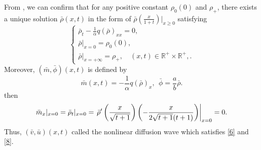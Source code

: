 \documentclass[11pt]{article}
\theoremstyle{plain}
\numberwithin{equation}{section}
\begin{document}
From \cite{Duyn-Peletier1977,Nishihara-Yang1999}, we can confirm that for any positive constant $\rho_{0}(0)$ and $\rho_{+}$, there exists a unique solution $\bar{\rho}(x, t)$ in the form of $\bar{\rho}(\frac{x}{1+t})|_{x \geq 0}$ satisfying
\begin{equation}\label{1.2}
\left\{\begin{array}{l}
\bar\rho_t-\frac{1}{\alpha}q(\bar\rho)_{xx}=0,\\[2mm]
\bar{\rho}|_{x=0}=\rho_{0}(0),\\[2mm]
 \bar{\rho}|_{x=+\infty}=\rho_{+},\quad (x,t)\in \mathbb{R}^{+}\times\mathbb{R}^{+},.
\end{array}
        \right.	
\end{equation}
 Moreover, $(\bar{m},\bar\phi)(x,t)$ is defined by
\begin{equation}\label{1.2a}
\bar{m}(x,t)=-\frac{1}{\alpha}q(\bar{\rho})_{x}, \ \ \bar\phi=\frac{a}{b}\bar\rho.	
\end{equation}
then
\begin{equation}\notag
\bar{m}_{x}|_{x=0}=\bar{\rho}_{t}|_{x=0}=\left.\bar{\rho}^{\prime}\left(\frac{x}{\sqrt{t+1}}\right)\left(-\frac{x}{2 \sqrt{t+1}(t+1)}\right)\right|_{x=0}=0.	
\end{equation}
Thus,  $(\bar{v},\bar{u})(x, t)$ called the nonlinear diffusion wave which satisfies \eqref{6} and \eqref{8}.
\end{document}

